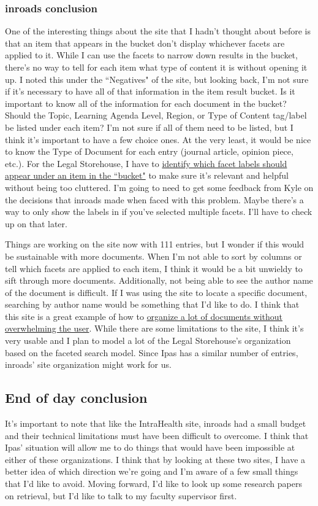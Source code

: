 \documentclass{article}
\begin{document}
\subsubsection{inroads conclusion}
One of the interesting things about the site that I hadn't thought about before is that an item that appears in the bucket don't display whichever facets are applied to it. While I can use the facets to narrow down results in the bucket, there's no way to tell for each item what type of content it is without opening it up. I noted this under the ``Negatives" of the site, but looking back, I'm not sure if it's necessary to have all of that information in the item result bucket. Is it important to know all of the information for each document in the bucket? Should the Topic, Learning Agenda Level, Region, or Type of Content tag/label be listed under each item? I'm not sure if all of them need to be listed, but I think it's important to have a few choice ones. At the very least, it would be nice to know the Type of Document for each entry (journal article, opinion piece, etc.). For the Legal Storehouse, I have to \ul{identify which facet labels should appear under an item in the ``bucket"} to make sure it's relevant and helpful without being too cluttered. I'm going to need to get some feedback from Kyle on the decisions that inroads made when faced with this problem. Maybe there's a way to only show the labels in  if you've selected multiple facets. I'll have to check up on that later.

Things are working on the site now with 111 entries, but I wonder if this would be sustainable with more documents. When I'm not able to sort by columns or tell which facets are applied to each item, I think it would be a bit unwieldy to sift through more documents. Additionally, not being able to see the author name of the document is difficult. If I was using the site to locate a specific document, searching by author name would be something that I'd like to do. I think that this site is a great example of how to \ul{organize a lot of documents without overwhelming the user}. While there are some limitations to the site, I think it's very usable and I plan to model a lot of the Legal Storehouse's organization based on the faceted search model. Since Ipas has a similar number of entries, inroads' site organization might work for us. 

\subsection{End of day conclusion}
It's important to note that like the IntraHealth site, inroads had a small budget and their technical limitations must have been difficult to overcome. I think that Ipas' situation will allow me to do things that would have been impossible at either of these organizations. I think that by looking at these two sites, I have a better idea of which direction we're going and I'm aware of a few small things that I'd like to avoid. Moving forward, I'd like to look up some research papers on retrieval, but I'd like to talk to my faculty supervisor first.
\end{document}
